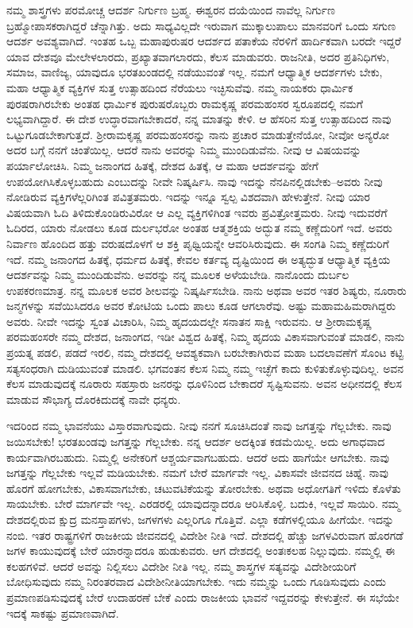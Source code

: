 ನಮ್ಮ ಶಾಸ್ತ್ರಗಳು ಪರಮೋಚ್ಚ ಆದರ್ಶ ನಿರ್ಗುಣ ಬ್ರಹ್ಮ. ಈಶ್ವರನ ದಯೆಯಿಂದ ನಾವೆಲ್ಲ ನಿರ್ಗುಣ ಬ್ರಹ್ಮೋಪಾಸಕರಾಗಿದ್ದರೆ ಚೆನ್ನಾಗಿತ್ತು. ಅದು ಸಾಧ್ಯವಿಲ್ಲದೇ ಇರುವಾಗ ಮುಕ್ಕಾಲುಪಾಲು ಮಾನವರಿಗೆ ಒಂದು ಸಗುಣ ಆದರ್ಶ ಅವಶ್ಯವಾಗಿದೆ. ಇಂತಹ ಒಬ್ಬ ಮಹಾಪುರುಷರ ಆದರ್ಶದ ಪತಾಕೆಯ ನೆರಳಿಗೆ ಹಾರ್ದಿಕವಾಗಿ ಬರದೇ ಇದ್ದರೆ ಯಾವ ದೇಶವೂ ಮೇಲೇಳಲಾರದು, ಪ್ರಖ್ಯಾತವಾಗಲಾರದು, ಕೆಲಸ ಮಾಡುವರು. ರಾಜನೀತಿ, ಅದರ ಪ್ರತಿನಿಧಿಗಳು, ಸಮಾಜ, ವಾಣಿಜ್ಯ, ಯಾವುದೂ ಭರತಖಂಡದಲ್ಲಿ ನಡೆಯುವಂತೆ ಇಲ್ಲ. ನಮಗೆ ಆಧ್ಯಾತ್ಮಿಕ ಆದರ್ಶಗಳು ಬೇಕು, ಮಹಾ ಆಧ್ಯಾತ್ಮಿಕ ವ್ಯಕ್ತಿಗಳ ಸುತ್ತ ಉತ್ಸಾಹದಿಂದ ನೆರೆಯಲು ಇಚ್ಛಿಸುವೆವು. ನಮ್ಮ ನಾಯಕರು ಧಾರ್ಮಿಕ ಪುರಷರಾಗಿರಬೇಕು ಅಂತಹ ಧಾರ್ಮಿಕ ಪುರುಷರೊಬ್ಬರು ರಾಮಕೃಷ್ಣ ಪರಮಹಂಸರ ಸ್ವರೂಪದಲ್ಲಿ ನಮಗೆ ಲಭ್ಯವಾಗಿದ್ದಾರೆ. ಈ ದೇಶ ಉದ್ಧಾರವಾಗಬೇಕಾದರೆ, ನನ್ನ ಮಾತನ್ನು ಕೇಳಿ. ಆ ಹೆಸರಿನ ಸುತ್ತ ಉತ್ಸಾಹದಿಂದ ನಾವು ಒಟ್ಟುಗೂಡಬೇಕಾಗುತ್ತದೆ. ಶ‍್ರೀರಾಮಕೃಷ್ಣ ಪರಮಹಂಸರನ್ನು ನಾನು ಪ್ರಚಾರ ಮಾಡುತ್ತೇನೆಯೋ, ನೀವೋ ಅನ್ಯರೋ ಅದರ ಬಗ್ಗೆ ನನಗೆ ಚಿಂತೆಯಿಲ್ಲ. ಆದರೆ ನಾನು ಅವರನ್ನು ನಿಮ್ಮ ಮುಂದಿಡುವೆನು. ನೀವು ಆ ವಿಷಯವನ್ನು ಪರ್ಯಾಲೋಚಿಸಿ. ನಿಮ್ಮ ಜನಾಂಗದ ಹಿತಕ್ಕೆ, ದೇಶದ ಹಿತಕ್ಕೆ, ಆ ಮಹಾ ಆದರ್ಶವನ್ನು ಹೇಗೆ ಉಪಯೋಗಿಸಿಕೊಳ್ಳಬಹುದು ಎಂಬುದನ್ನು ನೀವೇ ನಿಷ್ಕರ್ಷಿಸಿ. ನಾವು ಇದನ್ನು ನೆನಪಿನಲ್ಲಿಡಬೇಕು–ಅವರು ನೀವು ನೋಡಿರುವ ವ್ಯಕ್ತಿಗಳೆಲ್ಲರಿಗಿಂತ ಪವಿತ್ರತಮರು. ಇದನ್ನು ಇನ್ನೂ ಸ್ವಲ್ಪ ವಿಶದವಾಗಿ ಹೇಳುತ್ತೇನೆ. ನೀವು ಯಾರ ವಿಷಯವಾಗಿ ಓದಿ ತಿಳಿದುಕೊಂಡಿರುವಿರೋ ಆ ಎಲ್ಲ ವ್ಯಕ್ತಿಗಳಿಗಿಂತ ಇವರು ಪ್ರವಿತ್ರೋತ್ತಮರು. ನೀವು ಇದುವರೆಗೆ ಓದಿರದ, ಯಾರು ನೋಡಲು ಕೂಡ ದುರ್ಲಭರೋ ಅಂತಹ ಆತ್ಮಶಕ್ತಿಯ ಅದ್ಭುತ ನಮ್ಮ ಕಣ್ಣೆದುರಿಗೆ ಇದೆ. ಅವರು ನಿರ್ವಾಣ ಹೊಂದಿದ ಹತ್ತು ವರುಷದೊಳಗೆ ಆ ಶಕ್ತಿ ಪೃಥ್ವಿಯನ್ನೇ ಆವರಿಸಿರುವುದು. ಈ ಸಂಗತಿ ನಿಮ್ಮ ಕಣ್ಣೆದುರಿಗೆ ಇದೆ. ನಮ್ಮ ಜನಾಂಗದ ಹಿತಕ್ಕೆ, ಧರ್ಮದ ಹಿತಕ್ಕೆ, ಕೇವಲ ಕರ್ತವ್ಯ ದೃಷ್ಟಿಯಿಂದ ಈ ಅತ್ಯದ್ಭುತ ಆಧ್ಯಾತ್ಮಿಕ ವ್ಯಕ್ತಿಯ ಆದರ್ಶವನ್ನು ನಿಮ್ಮ ಮುಂದಿಡುವೆನು. ಅವರನ್ನು ನನ್ನ ಮೂಲಕ ಅಳೆಯಬೇಡಿ. ನಾನೊಂದು ದುರ್ಬಲ ಉಪಕರಣಮಾತ್ರ. ನನ್ನ ಮೂಲಕ ಅವರ ಶೀಲವನ್ನು ನಿಷ್ಕರ್ಷಿಸಬೇಡಿ. ನಾನು ಅಥವಾ ಅವರ ಇತರ ಶಿಷ್ಯರು, ನೂರಾರು ಜನ್ಮಗಳನ್ನು ಸವೆಯಿಸಿದರೂ ಅವರ ಕೋಟಿಯ ಒಂದು ಪಾಲು ಕೂಡ ಆಗಲಾರೆವು. ಅಷ್ಟು ಮಹಾಮಹಿಮರಾಗಿದ್ದರು ಅವರು. ನೀವೇ ಇದನ್ನು ಸ್ವಂತ ವಿಚಾರಿಸಿ, ನಿಮ್ಮ ಹೃದಯದಲ್ಲೇ ಸನಾತನ ಸಾಕ್ಷಿ ಇರುವನು. ಆ ಶ‍್ರೀರಾಮಕೃಷ್ಣ ಪರಮಹಂಸರೇ ನಮ್ಮ ದೇಶದ, ಜನಾಂಗದ, ಇಡೀ ವಿಶ್ವದ ಹಿತಕ್ಕೆ, ನಿಮ್ಮ ಹೃದಯ ವಿಕಾಸವಾಗುವಂತೆ ಮಾಡಲಿ, ನಾನು ಪ್ರಯತ್ನ ಪಡಲಿ, ಪಡದೆ ಇರಲಿ, ನಮ್ಮ ದೇಶದಲ್ಲಿ ಆವಶ್ಯಕವಾಗಿ ಬರಬೇಕಾಗಿರುವ ಮಹಾ ಬದಲಾವಣೆಗೆ ಸೊಂಟ ಕಟ್ಟಿ ಸತ್ಯಸಂಧರಾಗಿ ದುಡಿಯುವಂತೆ ಮಾಡಲಿ. ಭಗವಂತನ ಕೆಲಸ ನಿಮ್ಮ ನಮ್ಮ ಇಚ್ಛೆಗೆ ಕಾದು ಕುಳಿತುಕೊಳ್ಳುವುದಿಲ್ಲ. ಅವನ ಕೆಲಸ ಮಾಡುವುದಕ್ಕೆ ನೂರಾರು ಸಹಸ್ರಾರು ಜನರನ್ನು ಧೂಳಿನಿಂದ ಬೇಕಾದರೆ ಸೃಷ್ಟಿಸುವನು. ಅವನ ಅಧೀನದಲ್ಲಿ ಕೆಲಸ ಮಾಡುವ ಸೌಭಾಗ್ಯ ದೊರಕಿದುದಕ್ಕೆ ನಾವೇ ಧನ್ಯರು.

\vskip   5pt

ಇದರಿಂದ ನಮ್ಮ ಭಾವನೆಯು ವಿಸ್ತಾರವಾಗುವುದು. ನೀವು ನನಗೆ ಸೂಚಿಸಿದಂತೆ ನಾವು ಜಗತ್ತನ್ನು ಗೆಲ್ಲಬೇಕು. ನಾವು ಜಯಿಸಬೇಕು! ಭರತಖಂಡವು ಜಗತ್ತನ್ನು ಗೆಲ್ಲಬೇಕು. ನನ್ನ ಆದರ್ಶ ಅದಕ್ಕಿಂತ ಕಡಮೆಯಿಲ್ಲ. ಅದು ಅಗಾಧವಾದ ಕಾರ್ಯವಾಗಿರಬಹುದು. ನಿಮ್ಮಲ್ಲಿ ಅನೇಕರಿಗೆ ಆಶ್ಚರ್ಯವಾಗಬಹುದು. ಆದರೆ ಅದು ಹಾಗೆಯೇ ಆಗಬೇಕು. ನಾವು ಜಗತ್ತನ್ನು ಗೆಲ್ಲಬೇಕು ಇಲ್ಲವೆ ಮಡಿಯಬೇಕು. ನಮಗೆ ಬೇರೆ ಮಾರ್ಗವೇ ಇಲ್ಲ. ವಿಕಾಸವೇ ಜೀವನದ ಚಿಹ್ನೆ. ನಾವು ಹೊರಗೆ ಹೋಗಬೇಕು, ವಿಕಾಸವಾಗಬೇಕು, ಚಟುವಟಿಕೆಯನ್ನು ತೋರಬೇಕು. ಅಥವಾ ಅಧೋಗತಿಗೆ ಇಳಿದು ಕೊಳೆತು ಸಾಯಬೇಕು. ಬೇರೆ ಮಾರ್ಗವೇ ಇಲ್ಲ. ಎರಡರಲ್ಲಿ ಯಾವುದನ್ನಾದರೂ ಆರಿಸಿಕೊಳ್ಳಿ. ಬದುಕಿ, ಇಲ್ಲವೆ ಸಾಯಿರಿ. ನಮ್ಮ ದೇಶದಲ್ಲಿರುವ ಕ್ಷುದ್ರ ಮನಸ್ತಾಪಗಳು, ಜಗಳಗಳು ಎಲ್ಲರಿಗೂ ಗೊತ್ತಿವೆ. ಎಲ್ಲಾ ಕಡೆಗಳಲ್ಲಿಯೂ ಹೀಗೆಯೇ. ಇದನ್ನು ನಂಬಿ. ಇತರ ರಾಷ್ಟ್ರಗಳಿಗೆ ರಾಜಕೀಯ ಜೀವನದಲ್ಲಿ ವಿದೇಶೀ ನೀತಿ ಇದೆ. ದೇಶದಲ್ಲಿ ಹೆಚ್ಚು ಜಗಳವಿರುವಾಗ ಹೊರಗಡೆ ಜಗಳ ಕಾಯುವುದಕ್ಕೆ ಬೇರೆ ಯಾರನ್ನಾದರೂ ಹುಡುಕುವರು. ಆಗ ದೇಶದಲ್ಲಿ ಅಂತಃಕಲಹ ನಿಲ್ಲುವುದು. ನಮ್ಮಲ್ಲಿ ಈ ಕಲಹಗಳಿವೆ. ಆದರೆ ಅವನ್ನು ನಿಲ್ಲಿಸಲು ವಿದೇಶೀ ನೀತಿ ಇಲ್ಲ. ನಮ್ಮ ಶಾಸ್ತ್ರಗಳ ಸತ್ಯವನ್ನು ವಿದೇಶೀಯರಿಗೆ ಬೋಧಿಸುವುದು ನಮ್ಮ ನಿರಂತರವಾದ ವಿದೇಶೀನೀತಿಯಾಗಬೇಕು. ಇದು ನಮ್ಮನ್ನು ಒಂದು ಗೂಡಿಸುವುದು ಎಂದು ಪ್ರಮಾಣಪಡಿಸುವುದಕ್ಕೆ ಬೇರೆ ಉದಾಹರಣೆ ಬೇಕೆ ಎಂದು ರಾಜಕೀಯ ಭಾವನೆ ಇದ್ದವರನ್ನು ಕೇಳುತ್ತೇನೆ. ಈ ಸಭೆಯೇ ಇದಕ್ಕೆ ಸಾಕಷ್ಟು ಪ್ರಮಾಣವಾಗಿದೆ.

